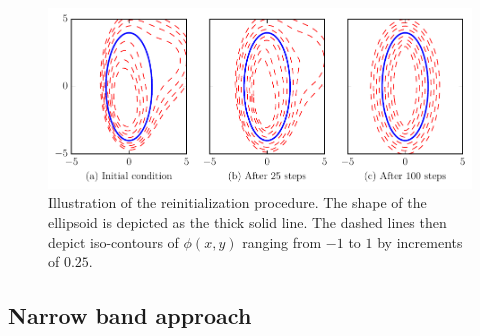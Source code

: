 \begin{figure}[t!]
\centering
  \includegraphics[width=\columnwidth]{Figures/redistancing_illustration_128x128.pdf}
  \caption{Illustration of the reinitialization procedure. The shape of the ellipsoid is depicted as the thick solid line. The dashed lines then depict iso-contours of $\phi(x,y)$ ranging from $-1$ to $1$ by increments of $0.25$.}
  \label{fig: redist}
\end{figure}



\iffalse  %

\subsection{Narrow band approach}
\label{subsec: NB}

